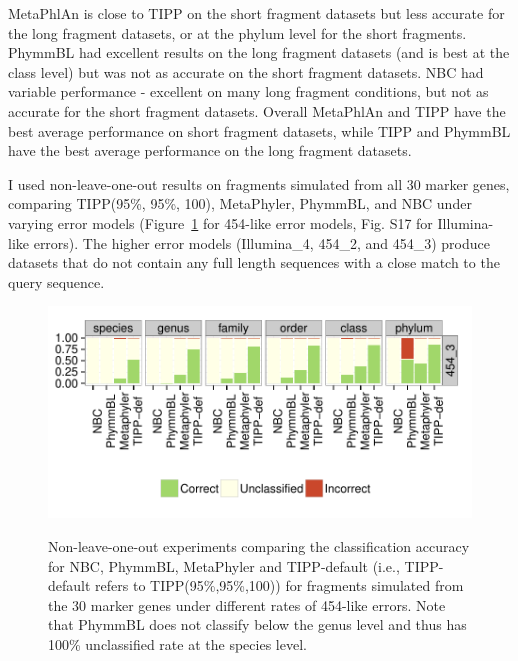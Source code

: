 MetaPhlAn is close to TIPP on the short fragment datasets
but less accurate for the long fragment datasets, or at the phylum level
for the short fragments.
PhymmBL had excellent results on the long
fragment datasets (and is best at the class level)
 but was not as accurate on the short fragment datasets.
NBC had variable performance - excellent on many long fragment
conditions, but not as accurate for the short fragment datasets.
Overall MetaPhlAn and TIPP have the best average performance
on short fragment datasets, 
while TIPP and PhymmBL have the best average performance on the
long fragment datasets.


I used non-leave-one-out results on fragments
simulated from all 30 marker genes, comparing
TIPP(95\%, 95\%, 100), MetaPhyler, PhymmBL, and NBC under varying error models (Figure~\ref{tipp:comparison_methods} for 454-like error models, Fig. S17 for Illumina-like errors).
The higher error models (Illumina\_4, 454\_2, and 454\_3)
produce  datasets that do not contain any full length sequences with a close match to the query sequence.

\begin{figure}[htpb]
\begin{center}
\label{tipp:comparison_methods_30M}{\includegraphics[scale=0.8]{tipp/higher_error_comparison_4_3_14.pdf}}
\end{center}
\caption{\label{tipp:comparison_methods} Non-leave-one-out experiments
          comparing the classification accuracy for NBC, PhymmBL, MetaPhyler
          and TIPP-default 
(i.e.,  TIPP-default refers to TIPP(95\%,95\%,100))
for fragments simulated from the 30 marker genes under different rates of 454-like errors.  Note that PhymmBL does not classify below the genus level and thus has 100\% unclassified rate at the species level.}
\end{figure}

